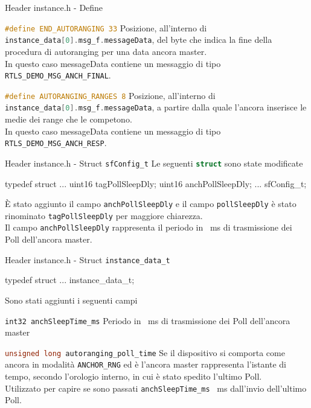 \begin{frame}[fragile]{Header instance.h - Define}
  \begin{block}{\lstinline[language=C]!#define END_AUTORANGING 33!}
    Posizione, all'interno di \lstinline[language=C]!instance_data[0].msg_f.messageData!, del byte
    che indica la fine della procedura di autoranging per una data ancora master.\\
    In questo caso messageData contiene un messaggio di tipo \lstinline[language=C]!RTLS_DEMO_MSG_ANCH_FINAL!.
  \end{block}
  \begin{block}{\lstinline[language=C]!#define AUTORANGING_RANGES 8!}
    Posizione, all'interno di \lstinline[language=C]!instance_data[0].msg_f.messageData!, a partire dalla quale
    l'ancora inserisce le medie dei range che le competono.\\
    In questo caso messageData contiene un messaggio di tipo \lstinline[language=C]!RTLS_DEMO_MSG_ANCH_RESP!.
  \end{block}
\end{frame}

\begin{frame}[fragile]{Header instance.h - Struct \lstinline[language=C]!sfConfig_t!}
  Le seguenti \lstinline[language=C]!struct! sono state modificate
  \begin{C}
    typedef struct
    {
      ...
      uint16 tagPollSleepDly;
      uint16 anchPollSleepDly;
      ...
    } sfConfig_t;
  \end{C}
  È stato aggiunto il campo \lstinline[language=C]!anchPollSleepDly! e il campo \lstinline[language=C]!pollSleepDly! è stato rinominato
  \lstinline[language=C]!tagPollSleepDly! per maggiore chiarezza.\\
  Il campo \lstinline[language=C]!anchPollSleepDly! rappresenta il periodo in \SI{}{\milli\second} di trasmissione dei Poll
  dell'ancora master.

\end{frame}

\begin{frame}[fragile]{Header instance.h - Struct \lstinline[language=C]!instance_data_t!}
  \begin{C}
    typedef struct
    {
      ...
    } instance_data_t;
  \end{C}
  Sono stati aggiunti i seguenti campi
  \begin{block}{\lstinline[language=C]!int32 anchSleepTime_ms!}
    Periodo in \SI{}{\milli\second} di trasmissione dei Poll dell'ancora master
  \end{block}
  
  \begin{block}{\lstinline[language=C]!unsigned long autoranging_poll_time!}
    Se il dispositivo si comporta come ancora in modalità \lstinline[language=C]!ANCHOR_RNG! ed è l'ancora master
    rappresenta l'istante di tempo, secondo l'orologio interno, in cui è stato spedito l'ultimo Poll.\\
    Utilizzato per capire se sono passati \lstinline[language=C]!anchSleepTime_ms! \SI{}{\milli\second} dall'invio dell'ultimo Poll.
  \end{block}
\end{frame}

